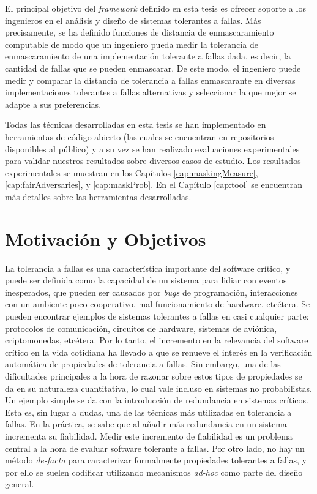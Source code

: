 El principal objetivo del \textit{framework} definido en esta tesis es  ofrecer soporte a los ingenieros en el análisis y diseño de sistemas tolerantes a fallas. Más precisamente, se ha definido funciones de distancia de enmascaramiento computable de modo que un ingeniero pueda medir la tolerancia de enmascaramiento de una implementación tolerante a fallas dada, es decir, la cantidad de fallas que se pueden enmascarar. De este modo, el ingeniero puede medir y comparar la distancia de tolerancia a fallas enmascarante en diversas implementaciones tolerantes a fallas alternativas y seleccionar la que mejor se adapte a sus preferencias.

Todas las técnicas desarrolladas en esta tesis se han implementado en herramientas de código abierto (las cuales se encuentran en repositorios disponibles al público) y a su vez se han realizado evaluaciones experimentales para validar nuestros resultados sobre diversos casos de estudio. Los resultados experimentales se muestran en los Capítulos \ref{cap:maskingMeasure}, \ref{cap:fairAdversaries}, y \ref{cap:maskProb}.  En el Capítulo \ref{cap:tool} se encuentran más detalles sobre las herramientas desarrolladas.

\section{Motivación y Objetivos}
\label{sec:intro.objetivos}

La tolerancia a fallas es una característica importante del software crítico, y puede ser definida como la capacidad de un sistema para lidiar con eventos inesperados, que pueden ser causados por \textit{bugs} de programación, interacciones con un ambiente poco cooperativo, mal funcionamiento de hardware, etcétera. Se pueden encontrar ejemplos de sistemas tolerantes a fallas en casi cualquier parte: protocolos de comunicación, circuitos de hardware, sistemas de aviónica, criptomonedas, etcétera. Por lo tanto, el incremento en la relevancia del software crítico en la vida cotidiana ha llevado a que se renueve el interés en la verificación automática de propiedades de tolerancia a fallas. Sin embargo, una de las dificultades principales a la hora de razonar sobre estos tipos de propiedades se da en su naturaleza cuantitativa, lo cual vale incluso en sistemas no probabilistas.
Un ejemplo simple se da con la introducción de redundancia en sistemas críticos. Esta es, sin lugar a dudas, una de las técnicas más utilizadas en tolerancia a fallas.
En la práctica, se sabe que al añadir más redundancia en un sistema incrementa su fiabilidad. Medir este incremento de fiabilidad es un problema central a la hora de evaluar software tolerante a fallas. Por otro lado, no hay un método \textit{de-facto} para caracterizar formalmente propiedades tolerantes a fallas, y por ello se suelen codificar utilizando mecanismos \textit{ad-hoc} como parte del diseño general.

